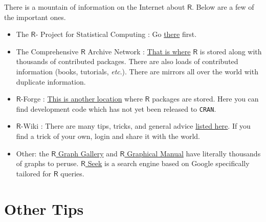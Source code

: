 There is a mountain of information on the Internet about
\(\mathsf{R}\). Below are a few of the important ones.
\begin{itemize}
\item The \(\mathsf{R}\)- Project for Statistical Computing : Go \href{http://www.r-project.org/}{there} first.
\item The Comprehensive \(\mathsf{R}\) Archive Network
: \href{http://cran.r-project.org/}{That is
where} \(\mathsf{R}\) is stored along with thousands of contributed
packages. There are also loads of contributed information (books,
tutorials, \emph{etc}.). There are mirrors all over the world with
duplicate information.
\item \(\mathsf{R}\)-Forge : \href{http://r-forge.r-project.org/}{This is
another location} where \(\mathsf{R}\) packages are stored. Here you
can find development code which has not yet been released to \texttt{CRAN}.
\item \(\mathsf{R}\)-Wiki : There are many
tips, tricks, and general advice \href{http://wiki.r-project.org/rwiki/doku.php}{listed here}. If you find a trick of
your own, login and share it with the world.
\item Other: the \href{http://addictedtor.free.fr/graphiques/}{\(\mathsf{R}\) Graph Gallery}  and \href{http://bm2.genes.nig.ac.jp/RGM2/index.php}{\(\mathsf{R}\) Graphical
Manual}  have
literally thousands of graphs to peruse. \href{http://www.rseek.org}{\(\mathsf{R}\) Seek} is a
search engine based on Google specifically tailored for
\(\mathsf{R}\) queries.
\end{itemize}

\section{Other Tips}
\label{sec-2-6}


